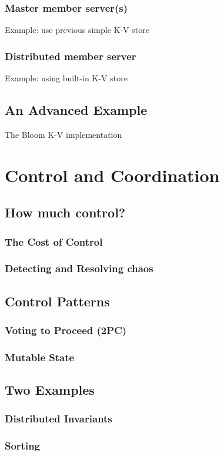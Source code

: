 \documentclass[]{book}
\begin{document}
        \subsection{Master member server(s)}
         Example: use previous simple K-V store
        \subsection{Distributed member server}
        Example: using built-in K-V store
    \section{An Advanced Example}
        The Bloom K-V implementation

\chapter{Control and Coordination}
    \section{How much control?}
        \subsection{The Cost of Control}
        \subsection{Detecting and Resolving chaos}
    \section{Control Patterns}
        \subsection{Voting to Proceed (2PC)}
        \subsection{Mutable State}
    \section{Two Examples}
        \subsection{Distributed Invariants}
        \subsection{Sorting}
        
\end{document}
